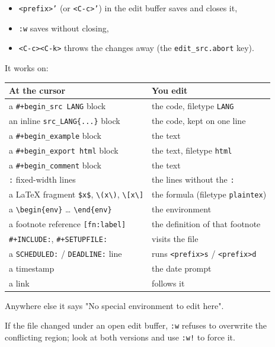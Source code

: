 \begin{itemize}
\item \texttt{<prefix>'} (or \texttt{<C-c>'}) in the edit buffer saves and closes it,
\item \texttt{:w} saves without closing,
\item \texttt{<C-c><C-k>} throws the changes away (the \texttt{edit\_src.abort} key).
\end{itemize}

It works on:

\begin{center}
\begin{tabular}{ll}
At the cursor & You edit\\
\hline
a \texttt{\#+begin\_src LANG} block & the code, filetype \texttt{LANG}\\
an inline \texttt{src\_LANG\{...\}} block & the code, kept on one line\\
a \texttt{\#+begin\_example} block & the text\\
a \texttt{\#+begin\_export html} block & the text, filetype \texttt{html}\\
a \texttt{\#+begin\_comment} block & the text\\
\texttt{:} fixed-width lines & the lines without the \texttt{:}\\
a \LaTeX{} fragment \texttt{\$x\$}, \texttt{\textbackslash{}(x\textbackslash{})}, \texttt{\textbackslash{}[x\textbackslash{}]} & the formula (filetype \texttt{plaintex})\\
a \texttt{\textbackslash{}begin\{env\}} \ldots{} \texttt{\textbackslash{}end\{env\}} & the environment\\
a footnote reference \texttt{[fn:label]} & the definition of that footnote\\
\texttt{\#+INCLUDE:}, \texttt{\#+SETUPFILE:} & visits the file\\
a \texttt{SCHEDULED:} / \texttt{DEADLINE:} line & runs \texttt{<prefix>s} / \texttt{<prefix>d}\\
a timestamp & the date prompt\\
a link & follows it\\
\end{tabular}
\end{center}

Anywhere else it says "No special environment to edit here".

If the file changed under an open edit buffer, \texttt{:w} refuses to overwrite
the conflicting region; look at both versions and use \texttt{:w!} to force it.
